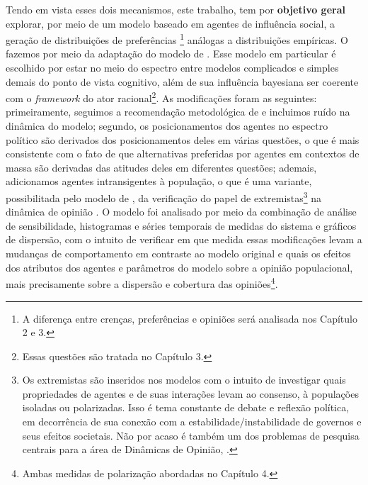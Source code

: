 Tendo em vista esses dois mecanismos, este trabalho, tem por \textbf{objetivo
  geral} explorar, por meio de um modelo baseado em agentes de influência
  social, a geração de distribuições de preferências \footnote{A diferença entre
  crenças, preferências e opiniões será analisada nos Capítulo 2 e 3.} análogas
  a distribuições empíricas. O fazemos por meio da adaptação do modelo de
  . Esse modelo em particular é escolhido por
  estar no meio do espectro entre modelos complicados e simples demais do ponto
  de vista cognitivo, além de sua influência bayesiana ser coerente com o
  \textit{framework} do ator racional\footnote{Essas questões são tratada no
  Capítulo 3.}. As modificações foram as seguintes: primeiramente, seguimos a
  recomendação metodológica de  e incluimos ruído na
  dinâmica do modelo; segundo, os posicionamentos dos agentes no espectro
  político são derivados dos posicionamentos deles em várias questões, o que é
  mais consistente com o fato de que alternativas preferidas por agentes em
  contextos de massa são derivadas das atitudes deles em diferentes questões;
  ademais, adicionamos agentes intransigentes à população, o que é uma variante,
  possibilitada pelo modelo de , da verificação
  do papel de extremistas\footnote{ Os extremistas são inseridos nos modelos com
  o intuito de investigar quais propriedades de agentes e de suas interações
  levam ao consenso, à populações isoladas ou polarizadas. Isso é tema constante
  de debate e reflexão política, em decorrência de sua conexão com a
  estabilidade/instabilidade de governos e seus efeitos societais. Não por acaso
  é também um dos problemas de pesquisa centrais para a área de Dinâmicas de
  Opinião, \cite{fiorina2005culture, pulick2016, bramson2016disambiguation}.} na
  dinâmica de opinião \cite{deffuant2002can, flache2017}. O modelo foi analisado
  por meio da combinação de análise de sensibilidade, histogramas e séries
  temporais de medidas do sistema e gráficos de dispersão, com o intuito de
  verificar em que medida essas modificações levam a mudanças de comportamento
  em contraste ao modelo original e quais os efeitos dos atributos dos agentes e
  parâmetros do modelo sobre a opinião populacional, mais precisamente sobre a
  dispersão e cobertura das opiniões\footnote{Ambas medidas de polarização
  abordadas no Capítulo 4.}.

